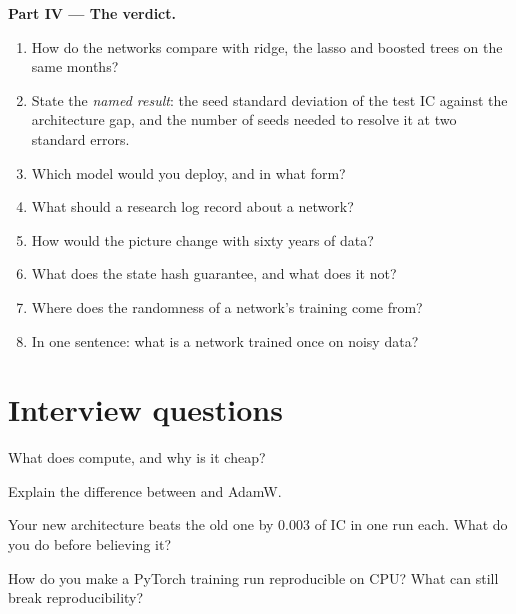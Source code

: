 \begin{problem}
\medskip\noindent\textbf{Part IV --- The verdict.}
\begin{enumerate}[resume]
\item How do the networks compare with ridge, the lasso and boosted trees on the same months?
\item State the \emph{named result}: the seed standard deviation of the test IC against the architecture gap, and the
number of seeds needed to resolve it at two standard errors.
\item Which model would you deploy, and in what form?
\item What should a research log record about a network?
\item How would the picture change with sixty years of data?
\item What does the state hash guarantee, and what does it not?
\item Where does the randomness of a network's training come from?
\item In one sentence: what is a network trained once on noisy data?
\end{enumerate}
\end{problem}

\section{Interview questions}

\begin{interviewq}\label{iq:ml:neural-networks-for-noisy-tabular-data:1}
What does  compute, and why is it cheap?
\end{interviewq}

\begin{interviewq}\label{iq:ml:neural-networks-for-noisy-tabular-data:2}
Explain the difference between  and AdamW.
\end{interviewq}

\begin{interviewq}\label{iq:ml:neural-networks-for-noisy-tabular-data:3}
Your new architecture beats the old one by 0.003 of IC in one run each. What do you do before believing it?
\end{interviewq}

\begin{interviewq}\label{iq:ml:neural-networks-for-noisy-tabular-data:4}
How do you make a PyTorch training run reproducible on CPU? What can still break reproducibility?
\end{interviewq}

